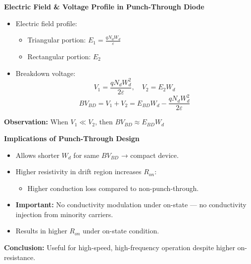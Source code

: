 \begin{frame}{\textbf{Electric Field \& Voltage Profile in Punch-Through Diode}}
    \begin{itemize}
        \item Electric field profile:
        \begin{itemize}
            \item Triangular portion: $E_1 = \frac{qN_dW_d}{\varepsilon}$
            \item Rectangular portion: $E_2$
        \end{itemize}
        \item Breakdown voltage:
        \begin{equation}
            V_1 = \frac{qN_dW_d^2}{2\varepsilon}, \quad V_2 = E_2 W_d
        \end{equation}
        \begin{equation}
            BV_{BD} = V_1 + V_2 = E_{BD}W_d - \frac{qN_dW_d^2}{2\varepsilon}
        \end{equation}
    \end{itemize}
    \textbf{Observation:} When $V_1 \ll V_2$, then $BV_{BD} \approx E_{BD}W_d$
\end{frame}

\begin{frame}{\textbf{Implications of Punch-Through Design}}
    \begin{itemize}
        \item Allows shorter $W_d$ for same $BV_{BD}$ → compact device.
        \item Higher resistivity in drift region increases $R_{on}$:
        \begin{itemize}
            \item Higher conduction loss compared to non-punch-through.
        \end{itemize}
        \item \textbf{Important:} No conductivity modulation under on-state — no conductivity injection from minority carriers.
        \item Results in higher $R_{on}$ under on-state condition.
    \end{itemize}
    \textbf{Conclusion:} Useful for high-speed, high-frequency operation despite higher on-resistance.
\end{frame}


